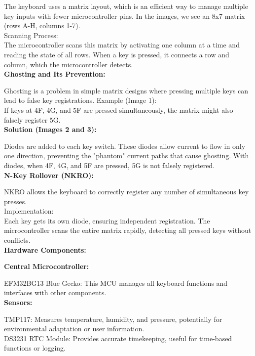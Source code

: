 \documentclass[a4paper,11pt]{article}%
\begin{document}
The keyboard uses a matrix layout, which is an efficient way to manage multiple key inputs with fewer microcontroller pins. In the images, we see an 8x7 matrix (rows A-H, columns 1-7).\\
Scanning Process:\\

The microcontroller scans this matrix by activating one column at a time and reading the state of all rows.
When a key is pressed, it connects a row and column, which the microcontroller detects.\\


\textbf{Ghosting and Its Prevention:}

Ghosting is a problem in simple matrix designs where pressing multiple keys can lead to false key registrations.
Example (Image 1):\\

If keys at 4F, 4G, and 5F are pressed simultaneously, the matrix might also falsely register 5G.\\

\textbf{Solution (Images 2 and 3):}

Diodes are added to each key switch.
These diodes allow current to flow in only one direction, preventing the "phantom" current paths that cause ghosting.
With diodes, when 4F, 4G, and 5F are pressed, 5G is not falsely registered.\\


\textbf{N-Key Rollover (NKRO):}

NKRO allows the keyboard to correctly register any number of simultaneous key presses.\\
Implementation:\\

Each key gets its own diode, ensuring independent registration.
The microcontroller scans the entire matrix rapidly, detecting all pressed keys without conflicts.\\


\textbf{Hardware Components:}

\textbf{Central Microcontroller:}

EFM32BG13 Blue Gecko: This MCU manages all keyboard functions and interfaces with other components.\\

\textbf{Sensors:}

TMP117: Measures temperature, humidity, and pressure, potentially for environmental adaptation or user information.\\
DS3231 RTC Module: Provides accurate timekeeping, useful for time-based functions or logging.\\
\end{document}
